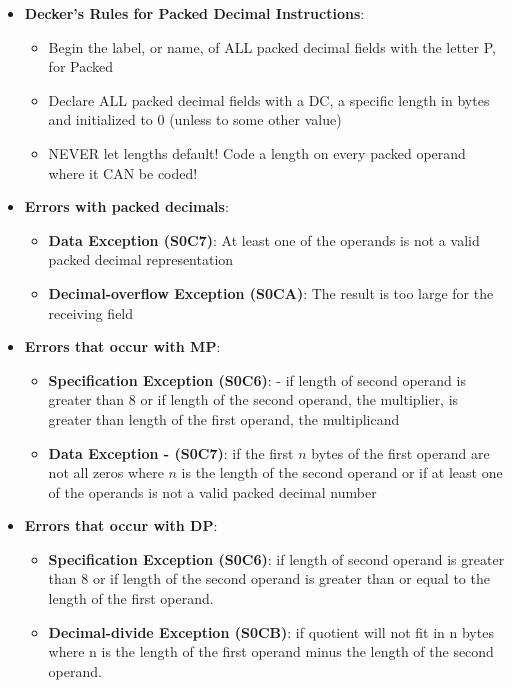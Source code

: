 \documentclass{report}
\begin{document}
\begin{itemize}
\begin{itemize}
            \end{itemize}
        \item \textbf{Decker's Rules for Packed Decimal Instructions}:
            \begin{itemize}
                \item Begin the label, or name, of ALL packed decimal fields with the letter P, for Packed
                \item Declare ALL packed decimal fields with a DC, a specific length in bytes and initialized to 0 (unless to some other value)
                \item NEVER let lengths default! Code a length on every packed operand where it CAN be coded!
            \end{itemize}
        \item \textbf{Errors with packed decimals}:
            \begin{itemize}
                \item \textbf{Data Exception (S0C7)}: At least one of the operands is not a valid packed decimal representation
                \item \textbf{Decimal-overflow Exception (S0CA)}: The result is too large for the receiving field
            \end{itemize}
        \item \textbf{Errors that occur with MP}:
            \begin{itemize}
                \item \textbf{Specification Exception (S0C6)}: - if length of second operand is greater than 8 or if length of the second operand, the multiplier, is greater than length of the first operand, the multiplicand
                \item \textbf{Data Exception - (S0C7)}: if the first $n$ bytes of the first operand are not all zeros where $n$ is the length of the second operand or if at least one of the operands is not a valid packed decimal number
            \end{itemize}
        \item \textbf{Errors that occur with DP}:
            \begin{itemize}
                \item \textbf{Specification Exception (S0C6)}: if length of second operand is greater than 8 or if length of the second operand is greater than or equal to the length of the first operand.
                \item \textbf{Decimal-divide Exception  (S0CB)}: if quotient will not fit in n bytes where n is the length of the first operand minus the length of the second operand.

\end{itemize}
\end{itemize}
\end{document}

